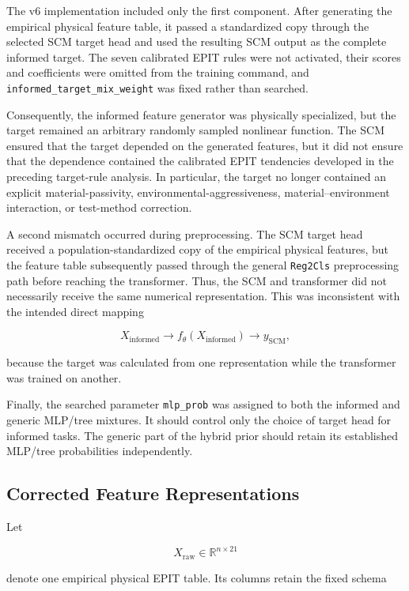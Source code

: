 \documentclass{article}
\begin{document}
The v6 implementation included only the first component. After generating the
empirical physical feature table, it passed a standardized copy through the
selected SCM target head and used the resulting SCM output as the complete
informed target. The seven calibrated EPIT rules were not activated, their
scores and coefficients were omitted from the training command, and
\texttt{informed\_target\_mix\_weight} was fixed rather than searched.

Consequently, the informed feature generator was physically specialized, but
the target remained an arbitrary randomly sampled nonlinear function. The SCM
ensured that the target depended on the generated features, but it did not
ensure that the dependence contained the calibrated EPIT tendencies developed
in the preceding target-rule analysis. In particular, the target no longer
contained an explicit material-passivity, environmental-aggressiveness,
material--environment interaction, or test-method correction.

A second mismatch occurred during preprocessing. The SCM target head received
a population-standardized copy of the empirical physical features, but the
feature table subsequently passed through the general
\texttt{Reg2Cls} preprocessing path before reaching the transformer. Thus, the
SCM and transformer did not necessarily receive the same numerical
representation. This was inconsistent with the intended direct mapping

\[
X_{\mathrm{informed}}
\longrightarrow
f_{\theta}(X_{\mathrm{informed}})
\longrightarrow
y_{\mathrm{SCM}},
\]

because the target was calculated from one representation while the
transformer was trained on another.

Finally, the searched parameter \texttt{mlp\_prob} was assigned to both the
informed and generic MLP/tree mixtures. It should control only the choice of
target head for informed tasks. The generic part of the hybrid prior should
retain its established MLP/tree probabilities independently.

\subsection{Corrected Feature Representations}

Let

\[
X_{\mathrm{raw}}\in\mathbb{R}^{n\times 21}
\]

denote one empirical physical EPIT table. Its columns retain the fixed schema
\end{document}

